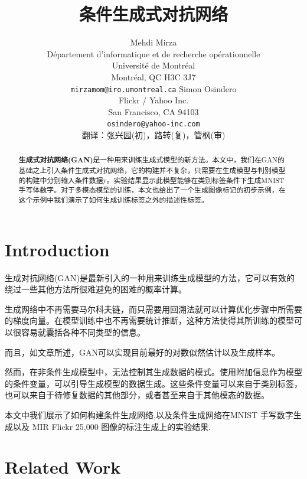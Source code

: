 \documentclass{article} %
\title{条件生成式对抗网络}
\author{
Mehdi Mirza \\
D\'epartement d'informatique et de recherche op\'erationnelle\\
Universit\'e de Montr\'eal\\
Montr\'eal, QC H3C 3J7 \\
\texttt{mirzamom@iro.umontreal.ca}
\AND
Simon Osindero \\
Flickr / Yahoo Inc. \\
San Francisco, CA 94103 \\
\texttt{osindero@yahoo-inc.com} \\
翻译：张兴园(初)，路转(复)，管枫(审)\\
}
\begin{document}
\maketitle

\begin{abstract}
\textbf{生成式对抗网络(GAN)}\cite{Goodfellow-et-al-NIPS2014-small}是一种用来训练生成式模型的新方法。本文中，我们在GAN的基础之上引入条件生成式对抗网络，它的构建并不复杂，只需要在生成模型与判别模型的构建中分别输入条件数据y。实验结果显示此模型能够在类别标签条件下生成MNIST手写体数字。对于多模态模型的训练，本文也给出了一个生成图像标记的初步示例，在这个示例中我们演示了如何生成训练标签之外的描述性标签。
\end{abstract}

\section{Introduction}

生成对抗网络(GAN)是最新引入的一种用来训练生成模型的方法，它可以有效的绕过一些其他方法所很难避免的困难的概率计算。

生成网络中不再需要马尔科夫链，而只需要用回溯法就可以计算优化步骤中所需要的梯度向量。在模型训练中也不再需要统计推断，这种方法使得其所训练的模型可以很容易就囊括各种不同类型的信息。

而且，如文章\cite{Goodfellow-et-al-NIPS2014-small}所述，GAN可以实现目前最好的对数似然估计以及生成样本。

然而，在非条件生成模型中，无法控制其生成数据的模式。使用附加信息作为模型的条件变量，可以引导生成模型的数据生成。这些条件变量可以来自于类别标签，也可以来自于待修复数据的其他部分\cite{goodfellow2013multi}，或者甚至来自于其他模态的数据。

本文中我们展示了如何构建条件生成网络,以及条件生成网络在MNIST 手写数字生成以及 MIR Flickr 25,000 图像\cite{huiskes08}的标注生成上的实验结果.

\section{Related Work}
\end{document}
